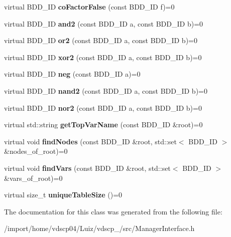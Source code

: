 \begin{DoxyCompactItemize}
\item 
virtual B\+D\+D\+\_\+\+ID {\bfseries co\+Factor\+False} (const B\+D\+D\+\_\+\+ID f)=0\label{classClassProject_1_1ManagerInterface_a308c99661ad02f407d6f2b0af6230e80}

\item 
virtual B\+D\+D\+\_\+\+ID {\bfseries and2} (const B\+D\+D\+\_\+\+ID a, const B\+D\+D\+\_\+\+ID b)=0\label{classClassProject_1_1ManagerInterface_af914326d34a1ed42710f7b11e5baf010}

\item 
virtual B\+D\+D\+\_\+\+ID {\bfseries or2} (const B\+D\+D\+\_\+\+ID a, const B\+D\+D\+\_\+\+ID b)=0\label{classClassProject_1_1ManagerInterface_a8dbfde761b1e94d1f222b4d27f3c6fbc}

\item 
virtual B\+D\+D\+\_\+\+ID {\bfseries xor2} (const B\+D\+D\+\_\+\+ID a, const B\+D\+D\+\_\+\+ID b)=0\label{classClassProject_1_1ManagerInterface_a2b2c4948ef41ddb1036289cd07dac156}

\item 
virtual B\+D\+D\+\_\+\+ID {\bfseries neg} (const B\+D\+D\+\_\+\+ID a)=0\label{classClassProject_1_1ManagerInterface_a57d34af3121dcf5366d22ecf792f05a0}

\item 
virtual B\+D\+D\+\_\+\+ID {\bfseries nand2} (const B\+D\+D\+\_\+\+ID a, const B\+D\+D\+\_\+\+ID b)=0\label{classClassProject_1_1ManagerInterface_aaf6e357d680613e449d3ea958c9abba1}

\item 
virtual B\+D\+D\+\_\+\+ID {\bfseries nor2} (const B\+D\+D\+\_\+\+ID a, const B\+D\+D\+\_\+\+ID b)=0\label{classClassProject_1_1ManagerInterface_a312d9865eae2d6355e17855cba78bc78}

\item 
virtual std\+::string {\bfseries get\+Top\+Var\+Name} (const B\+D\+D\+\_\+\+ID \&root)=0\label{classClassProject_1_1ManagerInterface_afde45b2065361dfa6e61c1c7bc3fc1b4}

\item 
virtual void {\bfseries find\+Nodes} (const B\+D\+D\+\_\+\+ID \&root, std\+::set$<$ B\+D\+D\+\_\+\+ID $>$ \&nodes\+\_\+of\+\_\+root)=0\label{classClassProject_1_1ManagerInterface_ab460e331ffdb85d4128574b3aae72c1e}

\item 
virtual void {\bfseries find\+Vars} (const B\+D\+D\+\_\+\+ID \&root, std\+::set$<$ B\+D\+D\+\_\+\+ID $>$ \&vars\+\_\+of\+\_\+root)=0\label{classClassProject_1_1ManagerInterface_ab94feabca2125d334e542e502ae0186d}

\item 
virtual size\+\_\+t {\bfseries unique\+Table\+Size} ()=0\label{classClassProject_1_1ManagerInterface_a85cac80444b26e5b80eb96b9f1231c0e}

\end{DoxyCompactItemize}


The documentation for this class was generated from the following file\+:\begin{DoxyCompactItemize}
\item 
/import/home/vdscp04/\+Luiz/vdscp\+\_/src/Manager\+Interface.\+h\end{DoxyCompactItemize}
